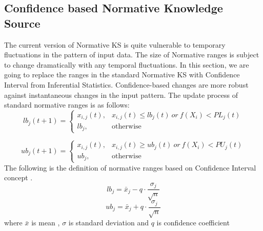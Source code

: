 \documentclass[letterpaper]{article}
\begin{document}
\subsection{Confidence based Normative Knowledge Source}
The current version of Normative KS is quite vulnerable to temporary fluctuations in the pattern of input data. The size of Normative ranges is subject to change dramatically with any temporal fluctuations. In this section, we are going to replace the ranges in the standard Normative KS with Confidence Interval from Inferential Statistics. Confidence-based changes are more robust against instantaneous changes in the input pattern. The update process of standard normative ranges is as follows:
\begin{equation}
		lb_{j}(t+1) = \begin{cases} x_{i,j}(t), & x_{i,j}(t)\leq lb_{j}(t)\:or\:f(X_{i})<PL_{j}(t)  \\ lb_{j}, & \mbox{otherwise} \end{cases}
\end{equation}

\begin{equation}
	ub_{j}(t+1) = \begin{cases} x_{i,j}(t), & x_{i,j}(t)\ge ub_{j}(t)\:or\:f(X_{i})<PU_{j}(t)  \\ ub_{j}, & \mbox{otherwise} \end{cases} 
\end{equation}%
The following is the definition of normative ranges based on Confidence Interval concept \cite{proakis1985probability}.
\begin{equation}
lb_{j}=\bar{x}_{j}-q\cdot\dfrac{\sigma_{j}}{\sqrt{n}}
\end{equation}
\begin{equation}
	ub_{j}=\bar{x}_{j}+q\cdot\dfrac{\sigma_{j}}{\sqrt{n}}
\end{equation}
where 
$\bar{x}$ is mean , $\sigma$ is standard deviation and $q$ is confidence coefficient \newline
\end{document}
